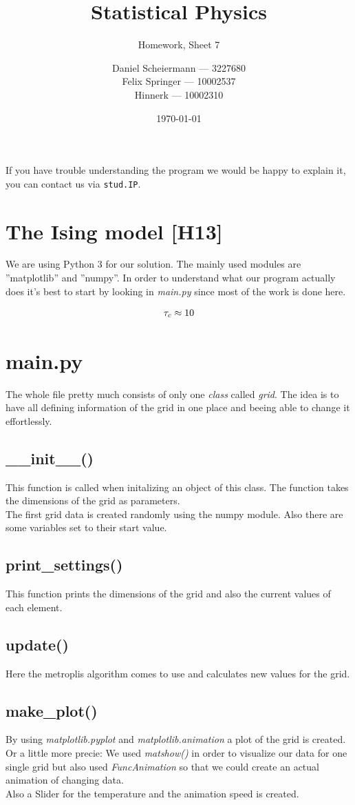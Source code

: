 \documentclass[a4paper,12pt]{scrartcl}
\title{Statistical Physics}
\subtitle{Homework, Sheet 7}
\author{Daniel Scheiermann --- 3227680 \\ Felix Springer --- 10002537 \\ Hinnerk --- 10002310}
\date{\today}
\begin{document}
\maketitle

If you have trouble understanding the program we would be happy to explain it, you can contact us via \texttt{stud.IP}.

\section{The Ising model [H13]}
We are using Python 3 for our solution. The mainly used modules are ''matplotlib'' and ''numpy''.
In order to understand what our program actually does it's best to start by looking in \textit{main.py} since most of the work is done here.

\begin{align}
	\tau_c \approx 10 \notag
\end{align}

\section{main.py}
The whole file pretty much consists of only one \textit{class} called \textit{grid}. The idea is to have all defining information of the grid in one place and beeing able to change it effortlessly. 

\subsection{\_\_init\_\_()}
This function is called when initalizing an object of this class. The function takes the dimensions of the grid as parameters. \\
The first grid data is created randomly using the numpy module. Also there are some variables set to their start value.

\subsection{print\_settings()}
This function prints the dimensions of the grid and also the current values of each element.

\subsection{update()}
Here the metroplis algorithm comes to use and calculates new values for the grid.

\subsection{make\_plot()}
By using \textit{matplotlib.pyplot} and \textit{matplotlib.animation} a plot of the grid is created. Or a little more precie: We used \textit{matshow()} in order to visualize our data for one single grid but also used \textit{FuncAnimation} so that we could create an actual animation of changing data. \\
Also a Slider for the temperature and the animation speed is created.
\end{document}
